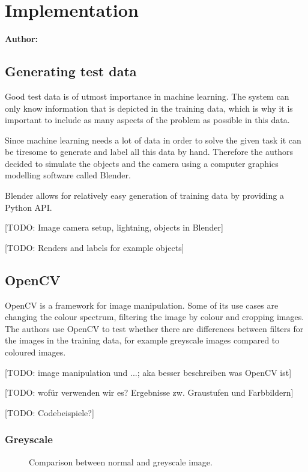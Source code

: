 \chapter{Implementation}

\textbf{Author: } 

\section{Generating test data}
Good test data is of utmost importance in machine learning. The system can only know information that is depicted in the training data, which is why it is important to include as many aspects of the problem as possible in this data.

Since machine learning needs a lot of data in order to solve the given task it can be tiresome to generate and label all this data by hand. Therefore the authors decided to simulate the objects and the camera using a computer graphics modelling software called Blender.

Blender allows for relatively easy generation of training data by providing a Python API.

[TODO: Image camera setup, lightning, objects in Blender]

[TODO: Renders and labels for example objects]

\section{OpenCV}
OpenCV is a framework for image manipulation. Some of its use cases are changing the colour spectrum, filtering the image by colour and cropping images. The authors use OpenCV to test whether there are differences between filters for the images in the training data, for example greyscale images compared to coloured images.

[TODO: image manipulation und ...; aka besser beschreiben was OpenCV ist]

[TODO: wofür verwenden wir es? Ergebnisse zw. Graustufen und Farbbildern]

[TODO: Codebeispiele?]

\subsection{Greyscale}

\begin{figure}[h!]
	\centering
	\caption{Comparison between normal and greyscale image.}
	\label{pic:implementation_opencv_greyscale}
\end{figure}

